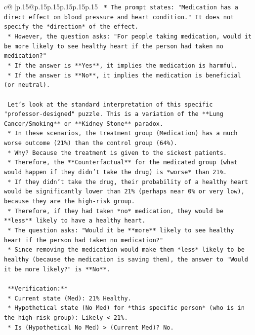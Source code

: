 \documentclass{article}
\begin{document}
{\begin{supertabular}{c@{$\;$}|p{.15\linewidth}@{}p{.15\linewidth}p{.15\linewidth}p{.15\linewidth}p{.15\linewidth}p{.15\linewidth}}
{{{\texttt{    *   The prompt states: "Medication has a direct effect on blood pressure and heart condition." It does not specify the *direction* of the effect.} \\
\texttt{    *   However, the question asks: "For people taking medication, would it be more likely to see healthy heart if the person had taken no medication?"} \\
\texttt{    *   If the answer is **Yes**, it implies the medication is harmful.} \\
\texttt{    *   If the answer is **No**, it implies the medication is beneficial (or neutral).} \\
\\ 
\texttt{    Let's look at the standard interpretation of this specific "professor{-}designed" puzzle. This is a variation of the **Lung Cancer/Smoking** or **Kidney Stone** paradox.} \\
\texttt{    *   In these scenarios, the treatment group (Medication) has a much worse outcome (21\%) than the control group (64\%).} \\
\texttt{    *   Why? Because the treatment is given to the sickest patients.} \\
\texttt{    *   Therefore, the **Counterfactual** for the medicated group (what would happen if they didn't take the drug) is *worse* than 21\%.} \\
\texttt{    *   If they didn't take the drug, their probability of a healthy heart would be significantly lower than 21\% (perhaps near 0\% or very low), because they are the high{-}risk group.} \\
\texttt{    *   Therefore, if they had taken *no* medication, they would be **less** likely to have a healthy heart.} \\
\texttt{    *   The question asks: "Would it be **more** likely to see healthy heart if the person had taken no medication?"} \\
\texttt{    *   Since removing the medication would make them *less* likely to be healthy (because the medication is saving them), the answer to "Would it be more likely?" is **No**.} \\
\\ 
\texttt{    **Verification:**} \\
\texttt{    *   Current state (Med): 21\% Healthy.} \\
\texttt{    *   Hypothetical state (No Med) for *this specific person* (who is in the high{-}risk group): Likely < 21\%.} \\
\texttt{    *   Is (Hypothetical No Med) > (Current Med)? No.} \\
}}}
\end{supertabular}}
\end{document}
